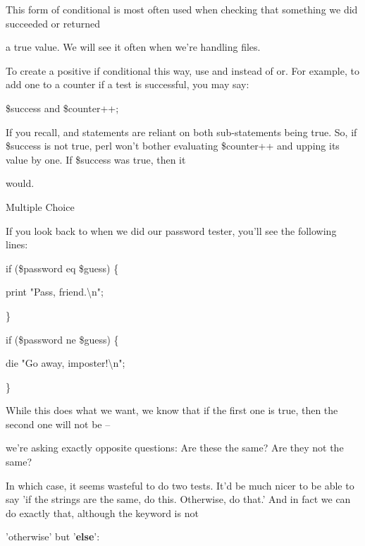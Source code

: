 \documentclass[a4paper,11pt]{book}
\begin{document}
\noindent 

\noindent This form of conditional is most often used when checking that something we did succeeded or returned

\noindent a true value. We will see it often when we're handling files.

\noindent 

\noindent To create a positive if conditional this way, use and instead of or. For example, to add one to a counter if a test is successful, you may say:

\noindent 

\noindent \$success and \$counter++;

\noindent 

\noindent If you recall, and statements are reliant on both sub-statements being true. So, if \$success is not true, perl won't bother evaluating \$counter++ and upping its value by one. If \$success was true, then it

\noindent would.

\noindent 

\noindent Multiple Choice

\noindent If you look back to when we did our password tester, you'll see the following lines:

\noindent 

\noindent if (\$password eq \$guess) \{

\noindent print "Pass, friend.\textbackslash n";

\noindent \}

\noindent if (\$password ne \$guess) \{

\noindent die "Go away, imposter!\textbackslash n";

\noindent \}

\noindent 

\noindent 

\noindent While this does what we want, we know that if the first one is true, then the second one will not be --

\noindent we're asking exactly opposite questions: Are these the same? Are they not the same?

\noindent 

\noindent In which case, it seems wasteful to do two tests. It'd be much nicer to be able to say 'if the strings are the same, do this. Otherwise, do that.' And in fact we can do exactly that, although the keyword is not

\noindent 'otherwise' but '\textbf{else}':
\end{document}
